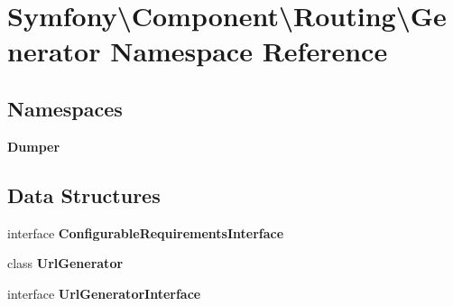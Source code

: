 \section{Symfony\textbackslash{}Component\textbackslash{}Routing\textbackslash{}Generator Namespace Reference}
\label{namespace_symfony_1_1_component_1_1_routing_1_1_generator}
\subsection*{Namespaces}
\begin{DoxyCompactItemize}
\item 
 {\bf Dumper}
\end{DoxyCompactItemize}
\subsection*{Data Structures}
\begin{DoxyCompactItemize}
\item 
interface {\bf Configurable\+Requirements\+Interface}
\item 
class {\bf Url\+Generator}
\item 
interface {\bf Url\+Generator\+Interface}
\end{DoxyCompactItemize}
